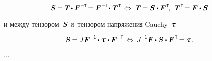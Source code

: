 \begin{otherlanguage}{russian}
\nopagebreak\vspace{-0.12em}\begin{equation*}
\secondpiolakirchhoffstress \hspace{-0.1ex}
= \firstpiolakirchhoffstress \hspace{-0.1ex} \dotp \bm{F}^{\hspace{.1ex}\expminusT} \hspace{-0.4ex}
= \bm{F}^{\hspace{.1ex}\expminusone} \hspace{-0.3ex} \dotp \hspace{.1ex} \firstpiolakirchhoffstress^{\hspace{.1ex}\T}
%
\hspace{.25ex} \Leftrightarrow \hspace{.75ex}
%
\firstpiolakirchhoffstress = \secondpiolakirchhoffstress \dotp \bm{F}^{\hspace{.1ex}\T}
\hspace{-0.4ex} , \:\:
\firstpiolakirchhoffstress^{\hspace{.1ex}\T} \hspace{-0.4ex} = \bm{F} \dotp \secondpiolakirchhoffstress
\end{equation*}

\vspace{-0.2em}\noindent
и между тензором~$\bm{S}$ и~тензором напряжения Cauchy~$\cauchystress$

\nopagebreak\vspace{-0.12em}\begin{equation*}
\secondpiolakirchhoffstress = J \bm{F}^{\hspace{.1ex}\expminusone} \hspace{-0.2ex} \dotp \cauchystress \hspace{.16ex} \dotp \bm{F}^{\hspace{.1ex}\expminusT}
\hspace{.2ex} \Leftrightarrow \hspace{.5ex}
J^{\hspace{.12ex}\expminusone} \bm{F} \hspace{-0.1ex} \dotp \secondpiolakirchhoffstress \dotp \bm{F}^{\hspace{.1ex}\T} \hspace{-0.32ex}
= \cauchystress \hspace{.1ex}.
\end{equation*}

...


\end{otherlanguage}
